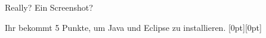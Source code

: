\begin{frame}[fragile]{Really? Ein Screenshot?}\onslide<+->%
    \begin{exercise}
    Ihr bekommt 5 Punkte, um Java und Eclipse zu installieren. \raisebox{-2pt}[0pt][0pt]{}
    \end{exercise}
    \onslide<+->\begin{solve}
    \end{solve}
\end{frame}